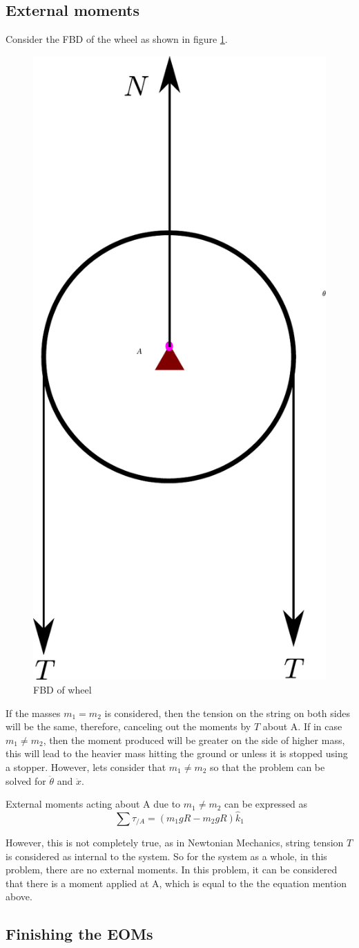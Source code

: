 \subsection{External moments}

Consider the FBD of the wheel as shown in figure \ref{fig_0_ch_4_twoMassSuspension_FBD_Wheel}.
\begin{figure}[h!]
\centering
\includegraphics[width=0.2\linewidth]{Bilder/25_TwoMassSuspension_FBD_Wheel.pdf}
\caption{FBD of wheel}
\label{fig_0_ch_4_twoMassSuspension_FBD_Wheel}
\end{figure}

If the masses $m_{1} = m_{2}$ is considered, then the tension on the string on both sides will be the same, therefore, canceling out the moments by $T$ about A. If in case $m_{1} \neq m_{2}$, then the moment produced will be greater on the side of higher mass, this will lead to the heavier mass hitting the ground or unless it is stopped using a stopper. However, lets consider that $m_{1} \neq m_{2}$ so that the problem can be solved for $\ddot{\theta}$ and $\ddot{x}$.

External moments acting about A due to $m_{1} \neq m_{2}$ can be expressed as
\begin{equation}
	\sum \tau_{/A} = \left(m_{1}gR - m_{2}gR\right)\hat{k}_{1}
\end{equation}

However, this is not completely true, as in Newtonian Mechanics, string tension $T$ is considered as internal to the system. So for the system as a whole, in this problem, there are no external moments. In this problem, it can be considered that there is a moment applied at A, which is equal to the the equation mention above.

\subsection{Finishing the EOMs}

